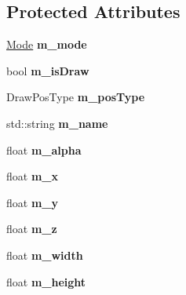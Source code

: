 \subsection*{Protected Attributes}
\begin{DoxyCompactItemize}
\item 
\hyperlink{class_sprite_a7e6c7652514341b0ccd721166a1d00d1}{Mode} {\bfseries m\+\_\+mode}\hypertarget{class_sprite_ada9da6a8ed8b81539e86b8ab0dde9d69}{}\label{class_sprite_ada9da6a8ed8b81539e86b8ab0dde9d69}

\item 
bool {\bfseries m\+\_\+is\+Draw}\hypertarget{class_sprite_ac9390a7e9c4605d29d888dcad59af234}{}\label{class_sprite_ac9390a7e9c4605d29d888dcad59af234}

\item 
Draw\+Pos\+Type {\bfseries m\+\_\+pos\+Type}\hypertarget{class_sprite_a23c37ce224637ae1f3fa146925618fc3}{}\label{class_sprite_a23c37ce224637ae1f3fa146925618fc3}

\item 
std\+::string {\bfseries m\+\_\+name}\hypertarget{class_sprite_aa62f8c64b12839b25ac67e2afbf2f040}{}\label{class_sprite_aa62f8c64b12839b25ac67e2afbf2f040}

\item 
float {\bfseries m\+\_\+alpha}\hypertarget{class_sprite_af13153e7ee278203552cf477cabda410}{}\label{class_sprite_af13153e7ee278203552cf477cabda410}

\item 
float {\bfseries m\+\_\+x}\hypertarget{class_sprite_a41e98ab9be3404db1fc7037bee042ab1}{}\label{class_sprite_a41e98ab9be3404db1fc7037bee042ab1}

\item 
float {\bfseries m\+\_\+y}\hypertarget{class_sprite_a62184d5c7605e5bd49b284c6249cb965}{}\label{class_sprite_a62184d5c7605e5bd49b284c6249cb965}

\item 
float {\bfseries m\+\_\+z}\hypertarget{class_sprite_a9cca3a51a0392d947676cc3c9858c778}{}\label{class_sprite_a9cca3a51a0392d947676cc3c9858c778}

\item 
float {\bfseries m\+\_\+width}\hypertarget{class_sprite_aff10eb00cfd126b2433c72148d71c8d0}{}\label{class_sprite_aff10eb00cfd126b2433c72148d71c8d0}

\item 
float {\bfseries m\+\_\+height}\hypertarget{class_sprite_a43feb4c9a3898a47c9a739b5912ddad7}{}\label{class_sprite_a43feb4c9a3898a47c9a739b5912ddad7}


\end{DoxyCompactItemize}
